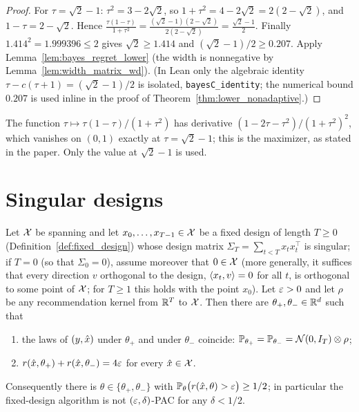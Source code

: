 \begin{proof}
\leanok
{}
For $\tau = \sqrt2 - 1$: $\tau^2 = 3 - 2\sqrt2$, so $1 + \tau^2 = 4 - 2\sqrt2 = 2(2-\sqrt2)$,
and $1 - \tau = 2 - \sqrt2$. Hence
$\frac{\tau(1-\tau)}{1+\tau^2} = \frac{(\sqrt2-1)(2-\sqrt2)}{2(2-\sqrt2)} = \frac{\sqrt2-1}{2}$.
Finally $1.414^2 = 1.999396 \le 2$ gives $\sqrt2 \ge 1.414$ and
$(\sqrt2-1)/2 \ge 0.207$. Apply Lemma~\ref{lem:bayes_regret_lower} (the width is
nonnegative by Lemma~\ref{lem:width_matrix_wd}).
(In Lean only the algebraic identity $\tau - c(\tau+1) = (\sqrt2-1)/2$ is isolated,
\texttt{bayesC\_identity}; the numerical bound $0.207$ is used inline in the proof of
Theorem~\ref{thm:lower_nonadaptive}.)
\end{proof}

\begin{remark}\label{rem:lower_nonadaptive_tau}
The function $\tau \mapsto \tau(1-\tau)/(1+\tau^2)$ has derivative
$(1 - 2\tau - \tau^2)/(1+\tau^2)^2$, which vanishes on $(0,1)$ exactly at $\tau = \sqrt2 - 1$;
this is the maximizer, as stated in the paper. Only the value at $\sqrt2 - 1$ is used.
\end{remark}

\section{Singular designs}
\label{sec:lower_nonadaptive_singular}

\begin{lemma}\label{lem:singular_design_fails}
\leanok
{}
Let $\mathcal{X}$ be spanning and let $x_0,\dots,x_{T-1} \in \mathcal{X}$ be a fixed design of length $T \ge 0$
(Definition~\ref{def:fixed_design}) whose design matrix $\Sigma_T = \sum_{t<T}x_tx_t^\top$ is
singular; if $T = 0$ (so that $\Sigma_0 = 0$), assume moreover that $0 \in \mathcal{X}$ (more generally,
it suffices that every direction $v$ orthogonal to the design, $\langle x_t, v \rangle = 0$ for all $t$, is
orthogonal to some point of $\mathcal{X}$; for $T \ge 1$ this holds with the point $x_0$). Let
$\varepsilon > 0$ and let $\rho$ be any recommendation kernel from $\mathbb{R}^T$ to $\mathcal{X}$. Then there are
$\theta_+, \theta_- \in \mathbb{R}^d$ such that
\begin{enumerate}
  \item[(i)] the laws of $(y, \hat{x})$ under $\theta_+$ and under $\theta_-$ coincide:
    $\mathbb{P}_{\theta_+} = \mathbb{P}_{\theta_-} = \mathcal{N}(0, I_T) \otimes \rho$;
  \item[(ii)] $r(\hat{x}, \theta_+) + r(\hat{x},\theta_-) = 4\varepsilon$ for every $\hat{x} \in \mathcal{X}$.
\end{enumerate}
Consequently there is $\theta \in \{\theta_+,\theta_-\}$ with
$\mathbb{P}_\theta\big(r(\hat{x},\theta) > \varepsilon\big) \ge 1/2$; in particular the fixed-design
algorithm is not $(\varepsilon,\delta)$-PAC for any $\delta < 1/2$.
\end{lemma}

